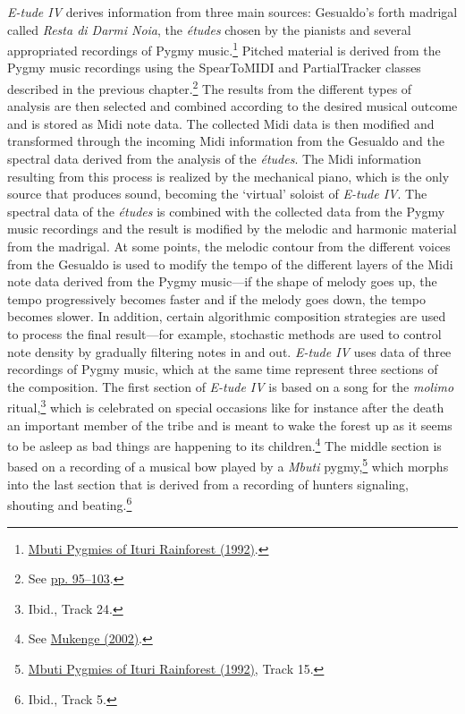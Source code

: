\emph{E-tude IV} derives information from three main sources: Gesualdo's forth madrigal called \emph{Resta di Darmi Noia}, the \emph{\'{e}tudes} chosen by the pianists and several appropriated recordings of Pygmy music.\footnote{\hyperlink{pygmy}{Mbuti Pygmies of Ituri Rainforest (1992)}.} Pitched material is derived from the Pygmy music recordings using the SpearToMIDI and PartialTracker classes described in the previous chapter.\footnote{See \hyperlink{spectrack}{pp. 95--103}.} The results from the different types of analysis are then selected and combined according to the desired musical outcome and is stored as Midi note data. The collected Midi data is then modified and transformed through the incoming Midi information from the Gesualdo and the spectral data derived from the analysis of the \emph{\'{e}tudes}. The Midi information resulting from this process is realized by the mechanical piano, which is the only source that produces sound, becoming the `virtual' soloist of \emph{E-tude IV}. The spectral data of the \emph{\'{e}tudes} is combined with the collected data from the Pygmy music recordings and the result is modified by the melodic and harmonic material from the madrigal. At some points, the melodic contour from the different voices from the Gesualdo is used to modify the tempo of the different layers of the Midi note data derived from the Pygmy music---if the shape of melody goes up, the tempo progressively becomes faster and if the melody goes down, the tempo becomes slower. In addition, certain algorithmic composition strategies are used to process the final result---for example, stochastic methods are used to control note density by gradually filtering notes in and out. \emph{E-tude IV} uses data of three recordings of Pygmy music, which at the same time represent three sections of the composition. The first section of \emph{E-tude IV} is based on a song for the \emph{molimo} ritual,\footnote{Ibid., Track 24.} which is celebrated on special occasions like for instance after the death an important member of the tribe and is meant to wake the forest up as it seems to be asleep as bad things are happening to its children.\footnote{See \hyperlink{mukenge}{Mukenge (2002)}.} The middle section is based on a recording of a musical bow played by a \emph{Mbuti} pygmy,\footnote{\hyperlink{pygmy}{Mbuti Pygmies of Ituri Rainforest (1992)}, Track 15.} which morphs into the last section that is derived from a recording of hunters signaling, shouting and beating.\footnote{Ibid., Track 5.}

